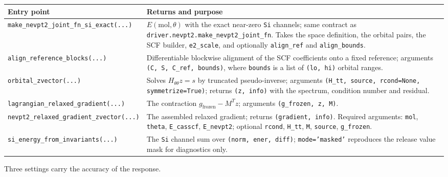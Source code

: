 \begin{center}
\small
\begin{tabularx}{\textwidth}{>{\raggedright\arraybackslash}p{}>{\raggedright\arraybackslash}X}
\toprule
Entry point & Returns and purpose \\
\midrule
\texttt{make\_nevpt2\_joint\_fn\_si\_exact(...)} &
  $E(\mathrm{mol},\theta)$ with the exact near-zero \texttt{Si}
  channels; same contract as
  \texttt{driver.nevpt2.make\_nevpt2\_joint\_fn}.  Takes the space
  definition, the orbital pairs, the SCF builder, \texttt{e2\_scale},
  and optionally \texttt{align\_ref} and \texttt{align\_bounds}. \\
\texttt{align\_reference\_blocks(...)} &
  Differentiable blockwise alignment of the SCF coefficients onto a
  fixed reference; arguments \texttt{(C, S, C\_ref, bounds)}, where
  \texttt{bounds} is a list of \texttt{(lo, hi)} orbital ranges. \\
\texttt{orbital\_zvector(...)} &
  Solves $H_{\theta\theta} z = s$ by truncated pseudo-inverse; arguments
  \texttt{(H\_tt, source, rcond=None, symmetrize=True)}; returns
  \texttt{(z, info)} with the spectrum, condition number and residual. \\
\texttt{lagrangian\_relaxed\_gradient(...)} &
  The contraction $g_{\mathrm{frozen}} - M^{T} z$; arguments
  \texttt{(g\_frozen, z, M)}. \\
\texttt{nevpt2\_relaxed\_gradient\_zvector(...)} &
  The assembled relaxed gradient; returns \texttt{(gradient, info)}.
  Required arguments: \texttt{mol}, \texttt{theta}, \texttt{E\_casscf},
  \texttt{E\_nevpt2}; optional \texttt{rcond}, \texttt{H\_tt},
  \texttt{M}, \texttt{source}, \texttt{g\_frozen}. \\
\texttt{si\_energy\_from\_invariants(...)} &
  The \texttt{Si} channel sum over \texttt{(norm, ener, diff)};
  \texttt{mode='masked'} reproduces the release value mask for
  diagnostics only. \\
\bottomrule
\end{tabularx}
\end{center}

Three settings carry the accuracy of the response.

